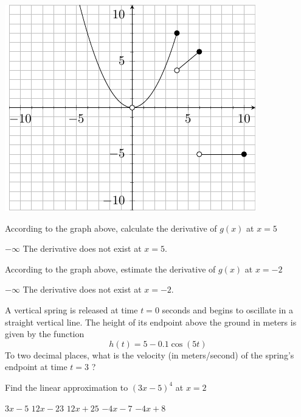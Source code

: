 \documentclass[11pt]{article}
\begin{document}
\begin{questions}
\begin{multiplechoice}{5}
\begin{questions}
\begin{multiplechoice}{5}
\begin{questions}
\begin{multiplechoice}{5}
\begin{minipage}{\linewidth}%
\centering
\makebox[\linewidth]{}
\includegraphics{exam2graph2.pdf}
\label{graph2exam1}%
\end{minipage}
\question According to the graph above, calculate the derivative of $g(x)$ at $x = 5$
\begin{answers}{2}
\ans $-\infty$
\ans The derivative does not exist at $x=5$.
\end{answers}

\question According to the graph above, estimate the derivative of $g(x)$ at $x = -2$
\begin{answers}{2}
\ans $-\infty$
\ans The derivative does not exist at $x= -2$.
\end{answers}


\question A vertical spring is released at time $t = 0$ seconds and begins to oscillate in a straight vertical line.
The height of its endpoint above the ground in meters is given by the function
$$h(t) = 5 - 0.1\cos(5t)$$
To two decimal places, what is the velocity (in meters/second) of the spring's endpoint at time $t = 3$ ?
\begin{answers}{2}
\end{answers}

\newpage

\question Find the linear approximation to $(3x-5)^4$ at $x = 2$
\begin{answers}{2}
\ans $3x - 5$
\ans $12x - 23$
\ans $12x + 25$
\ans $-4x - 7$
\ans $-4x + 8$
\end{answers}



\end{multiplechoice}
\end{questions}
\end{multiplechoice}
\end{questions}
\end{multiplechoice}
\end{questions}
\end{document}
